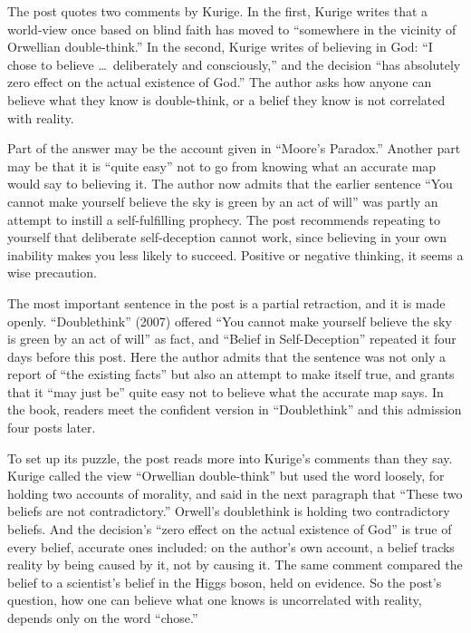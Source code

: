 \begin{afterword}
\summaryhead

The post quotes two comments by Kurige. In the first, Kurige writes that a world-view once based on blind faith has moved to ``somewhere in the vicinity of Orwellian double-think.'' In the second, Kurige writes of believing in God: ``I chose to believe \ldots\ deliberately and consciously,'' and the decision ``has absolutely zero effect on the actual existence of God.'' The author asks how anyone can believe what they know is double-think, or a belief they know is not correlated with reality.

Part of the answer may be the account given in ``Moore's Paradox.'' Another part may be that it is ``quite easy'' not to go from knowing what an accurate map would say to believing it. The author now admits that the earlier sentence ``You cannot make yourself believe the sky is green by an act of will'' was partly an attempt to instill a self-fulfilling prophecy. The post recommends repeating to yourself that deliberate self-deception cannot work, since believing in your own inability makes you less likely to succeed. Positive or negative thinking, it seems a wise precaution.

\responsehead

The most important sentence in the post is a partial retraction, and it is made openly. ``Doublethink'' (2007) offered ``You cannot make yourself believe the sky is green by an act of will'' as fact, and ``Belief in Self-Deception'' repeated it four days before this post. Here the author admits that the sentence was not only a report of ``the existing facts'' but also an attempt to make itself true, and grants that it ``may just be'' quite easy not to believe what the accurate map says. In the book, readers meet the confident version in ``Doublethink'' and this admission four posts later.

To set up its puzzle, the post reads more into Kurige's comments than they say. Kurige called the view ``Orwellian double-think'' but used the word loosely, for holding two accounts of morality, and said in the next paragraph that ``These two beliefs are not contradictory.'' Orwell's doublethink is holding two contradictory beliefs. And the decision's ``zero effect on the actual existence of God'' is true of every belief, accurate ones included: on the author's own account, a belief tracks reality by being caused by it, not by causing it. The same comment compared the belief to a scientist's belief in the Higgs boson, held on evidence. So the post's question, how one can believe what one knows is uncorrelated with reality, depends only on the word ``chose.''


\end{afterword}

